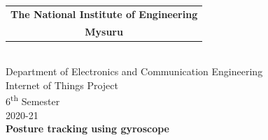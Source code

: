 \documentclass[a4paper,12pt]{report}
\begin{document}
\begin{titlepage}
    \begin{center}
        \noindent
        \hfill
        \begin{tabular}{@{}c@{}}
            \textbf{\Large The National Institute of Engineering} \\
            \textbf{\Large{Mysuru}}
        \end{tabular}
        \hfill
         \\
        \vspace{5cm}
        {\huge Department of Electronics and Communication Engineering} \\
        \vspace{2cm}
        \large{Internet of Things Project} \\
        \large{6\textsuperscript{th} Semester} \\
        \large{2020-21} \\
        \vspace{1cm}
        \textbf{\huge Posture tracking using gyroscope} \\
        \vspace{1cm}

\end{center}
\end{titlepage}
\end{document}

